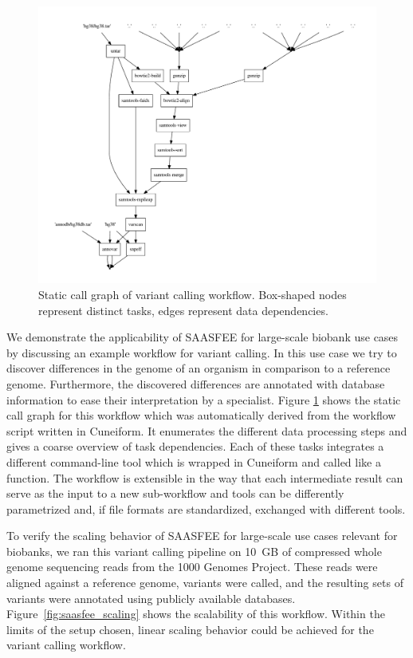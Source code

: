 \begin{figure}
  \centering
  \includegraphics[width=.8\textwidth]{imgs/variant_call11b.pdf}
  \caption{Static call graph of variant calling workflow. Box-shaped nodes represent distinct tasks, edges represent data dependencies.}
  \label{fig:variant_call}
\end{figure}

We demonstrate the applicability of SAASFEE for large-scale biobank use cases by discussing an example workflow for variant calling. In this use case we try to discover differences in the genome of an organism in comparison to a reference genome. Furthermore, the discovered differences are annotated with database information to ease their interpretation by a specialist. Figure \ref{fig:variant_call} shows the static call graph for this workflow which was automatically derived from the workflow script written in Cuneiform. It enumerates the different data processing steps and gives a coarse overview of task dependencies. Each of these tasks integrates a different command-line tool which is wrapped in Cuneiform and called like a function. The workflow is extensible in the way that each intermediate result can serve as the input to a new sub-workflow and tools can be differently parametrized and, if file formats are standardized, exchanged with different tools.




To verify the scaling behavior of SAASFEE for large-scale use cases relevant for biobanks, we ran this variant calling pipeline on 10~GB of compressed whole genome sequencing reads from the 1000 Genomes Project. These reads were aligned against a reference genome, variants were called, and the resulting sets of variants were annotated using publicly available databases. Figure~\ref{fig:saasfee_scaling} shows the scalability of this workflow. Within the limits of the setup chosen, linear scaling behavior could be achieved for the variant calling workflow.

